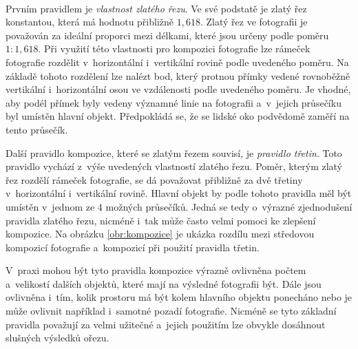 \paragraph{}
Prvním pravidlem je \emph{vlastnost zlatého řezu}. Ve své podstatě je zlatý řez konstantou, která má hodnotu přibližně $1,618$. Zlatý řez ve fotografii je považován za ideální proporci mezi délkami, které jsou určeny podle poměru $1:1,618$. Při využití této vlastnosti pro kompozici fotografie lze rámeček fotografie rozdělit v~horizontální i~vertikální rovině podle uvedeného poměru. Na základě tohoto rozdělení lze nalézt bod, který protnou přímky vedené rovnoběžně vertikální i~horizontální osou ve vzdálenosti podle uvedeného poměru. Je vhodné, aby podél přímek byly vedeny významné linie na fotografii a~v~jejich průsečíku byl umístěn hlavní objekt. Předpokládá se, že se lidské oko podvědomě zaměří na tento průsečík.

Další pravidlo kompozice, které se zlatým řezem souvisí, je \emph{pravidlo třetin}. Toto pravidlo vychází z~výše uvedených vlastností zlatého řezu. Poměr, kterým zlatý řez rozdělí rámeček fotografie, se dá považovat přibližně za dvě třetiny v~horizontální i~vertikální rovině. Hlavní objekt by podle tohoto pravidla měl být umístěn v~jednom ze 4 možných průsečíků. Jedná se tedy o~výrazné zjednodušení pravidla zlatého řezu, nicméně i~tak může často velmi pomoci ke zlepšení kompozice. Na obrázku \ref{obr:kompozice} je ukázka rozdílu mezi středovou kompozicí fotografie a~kompozicí při použití pravidla třetin.

V~praxi mohou být tyto pravidla kompozice výrazně ovlivněna počtem a~velikostí dalších objektů, které mají na výsledné fotografii být. Dále jsou ovlivněna i~tím, kolik prostoru má být kolem hlavního objektu ponecháno nebo je může ovlivnit například i~samotné pozadí fotografie. Nicméně se tyto základní pravidla považují za velmi užitečné a~jejich použitím lze obvykle dosáhnout slušných výsledků ořezu. 


